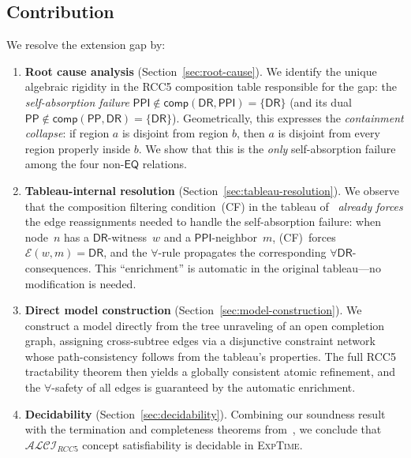 \documentclass[a4paper,11pt]{article}
\theoremstyle{definition}
\newcommand{\ALCIRCC}[1]{\ensuremath{\mathcal{ALCI}_{\mathit{RCC#1}}}}
\newcommand{\DR}{\ensuremath{\mathsf{DR}}}
\newcommand{\EQ}{\ensuremath{\mathsf{EQ}}}
\newcommand{\PP}{\ensuremath{\mathsf{PP}}}
\newcommand{\PPI}{\ensuremath{\mathsf{PPI}}}
\newcommand{\comp}{\ensuremath{\mathsf{comp}}}
\newcommand{\EXPTIME}{\textsc{ExpTime}}
\begin{document}
\subsection{Contribution}

We resolve the extension gap by:
\begin{enumerate}[nosep]
  \item \textbf{Root cause analysis} (Section~\ref{sec:root-cause}).
    We identify the unique algebraic rigidity in the RCC5 composition
    table responsible for the gap: the \emph{self-absorption failure}
    $\PPI \notin \comp(\DR, \PPI) = \{\DR\}$ (and its dual
    $\PP \notin \comp(\PP, \DR) = \{\DR\}$).  Geometrically, this
    expresses the \emph{containment collapse}: if region $a$ is
    disjoint from region $b$, then $a$ is disjoint from every region
    properly inside $b$.  We show that this is the \emph{only}
    self-absorption failure among the four non-$\EQ$ relations.

  \item \textbf{Tableau-internal resolution}
    (Section~\ref{sec:tableau-resolution}).  We observe that the
    composition filtering condition~(CF) in the tableau
    of~\cite{CompanionPaper} \emph{already forces} the edge
    reassignments needed to handle the self-absorption failure: when
    node~$n$ has a $\DR$-witness~$w$ and a $\PPI$-neighbor~$m$,
    (CF)~forces $\mathcal{E}(w, m) = \DR$, and the $\forall$-rule
    propagates the corresponding $\forall\DR$-consequences.  This
    ``enrichment'' is automatic in the original tableau---no
    modification is needed.

  \item \textbf{Direct model construction}
    (Section~\ref{sec:model-construction}).  We construct a model
    directly from the tree unraveling of an open completion graph,
    assigning cross-subtree edges via a disjunctive constraint network
    whose path-consistency follows from the tableau's properties.  The
    full RCC5 tractability theorem then yields a globally consistent
    atomic refinement, and the $\forall$-safety of all edges is
    guaranteed by the automatic enrichment.

  \item \textbf{Decidability} (Section~\ref{sec:decidability}).
    Combining our soundness result with the termination and
    completeness theorems from~\cite{CompanionPaper}, we conclude that
    $\ALCIRCC{5}$ concept satisfiability is decidable in \EXPTIME.
\end{enumerate}
\end{document}
